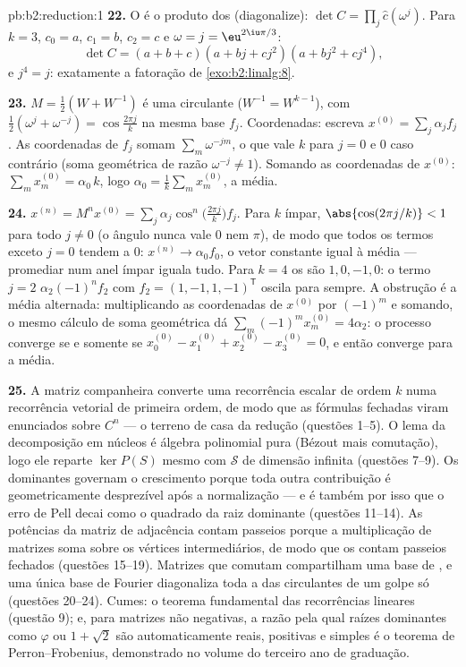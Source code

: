 \begin{solution}{pb:b2:reduction:1}
\textbf{22.} O  é o produto dos 
(diagonalize): $\det C = \prod_{j}\widehat c(\omega^j)$. Para $k
= 3$, $c_0 = a$, $c_1 = b$, $c_2 = c$ e $\omega = j =
\eu^{2\iu\pi/3}$:
\[
\det C = (a + b + c)(a + bj + cj^2)(a + bj^2 + cj^4),
\]
e $j^4 = j$: exatamente a fatoração de
\cref{exo:b2:linalg:8}.

\textbf{23.} $M = \frac12(W + W^{-1})$ é uma circulante ($W^{-1} =
W^{k-1}$), com  $\frac12(\omega^j + \omega^{-j}) =
\cos\frac{2\pi j}k$ na mesma base $f_j$. Coordenadas: escreva
$x^{(0)} = \sum_j \alpha_j f_j$. As coordenadas de $f_j$ somam
$\sum_m \omega^{-jm}$, o que vale $k$ para $j = 0$ e $0$
caso contrário (soma geométrica de razão $\omega^{-j} \neq 1$).
Somando as coordenadas de $x^{(0)}$: $\sum_m x^{(0)}_m =
\alpha_0\,k$, logo $\alpha_0 = \frac1k\sum_m x^{(0)}_m$, a média.

\textbf{24.} $x^{(n)} = M^nx^{(0)} = \sum_j
\alpha_j\cos^n\bigl(\tfrac{2\pi j}k\bigr)f_j$. Para $k$ ímpar,
$\abs{\cos(2\pi j/k)} < 1$ para todo $j \neq 0$ (o ângulo nunca
vale $0$ nem $\pi$), de modo que todos os termos exceto $j = 0$ tendem a $0$:
$x^{(n)} \to \alpha_0 f_0$, o vetor constante igual à
média --- promediar num anel ímpar iguala tudo. Para $k = 4$ os
 são $1, 0, -1, 0$: o termo $j = 2$
$\alpha_2(-1)^nf_2$ com $f_2 = (1, -1, 1, -1)^{\mathsf T}$
oscila para sempre. A obstrução é a média alternada:
multiplicando as coordenadas de $x^{(0)}$ por $(-1)^m$ e
somando, o mesmo cálculo de soma geométrica dá $\sum_m
(-1)^mx^{(0)}_m = 4\alpha_2$: o processo converge se e somente se
$x^{(0)}_0 - x^{(0)}_1 + x^{(0)}_2 - x^{(0)}_3 = 0$, e então
converge para a média.

\textbf{25.} A matriz companheira converte uma recorrência escalar
de ordem $k$ numa recorrência vetorial de primeira ordem, de modo que
as fórmulas fechadas viram enunciados sobre $C^n$ --- o terreno de
casa da redução (questões 1--5). O lema da decomposição em núcleos é
álgebra polinomial pura (Bézout mais comutação), logo ele reparte
$\ker P(S)$ mesmo com $\mathcal{S}$ de dimensão infinita
(questões 7--9). Os  dominantes governam o crescimento porque
toda outra contribuição é geometricamente desprezível após a
normalização --- e é também por isso que o erro de Pell decai como o
quadrado da raiz dominante (questões 11--14). As potências da
matriz de adjacência contam passeios porque a multiplicação de matrizes soma
sobre os vértices intermediários, de modo que os  contam passeios fechados
(questões 15--19). Matrizes que comutam compartilham uma base de , e
uma única base de Fourier diagonaliza toda a  das circulantes
de um golpe só (questões 20--24). Cumes: o teorema
fundamental das recorrências lineares (questão 9); e, para matrizes
não negativas, a razão pela qual raízes dominantes como $\varphi$ ou $1 +
\sqrt2$ são automaticamente reais, positivas e simples é o
teorema de Perron--Frobenius, demonstrado no volume do terceiro ano de graduação.
\end{solution}
